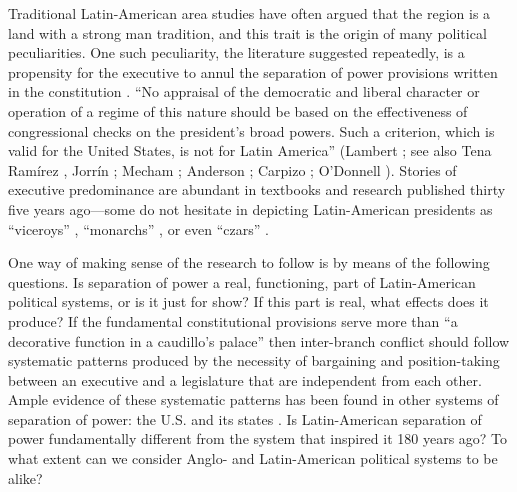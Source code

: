 Traditional Latin-American area studies have often argued that the region is a land with a strong man tradition, and this trait is the origin of many political peculiarities.  One such peculiarity, the literature suggested repeatedly, is a propensity for the executive to annul the separation of power provisions written in the constitution \citep{dealy.1992,segovia.1975,meyer.reyna.1989,garcia.hamilton.1990,wiarda.1992}.  ``No appraisal of the democratic and liberal character or operation of a regime of this nature should be based on the effectiveness of congressional checks on the president's broad powers.  Such a criterion, which is valid for the United States, is not for Latin America'' (Lambert \citeyear[][19]{lambert.1971}; see also Tena Ramírez \citeyear{tena.1949}, Jorrín \citeyear{jorrin.1953}; Mecham \citeyear{mecham.1959}; Anderson \citeauthor{anderson.1967}; Carpizo \citeyear{carpizo.1978}; O'Donnell \citeyear{odonnell.1994}).  Stories of executive predominance are abundant in textbooks and research published thirty five years ago---some do not hesitate in depicting Latin-American presidents as ``viceroys'' \citep[][291]{scott.1958}, ``monarchs'' \citep[][410]{edelmann.1969}, or even ``czars'' \citep[][225]{pierson.gil.1957}.  

One way of making sense of the research to follow is by means of the following questions.  Is separation of power a real, functioning, part of Latin-American political systems, or is it just for show?  If this part is real, what effects does it produce?  If the fundamental constitutional provisions serve more than ``a decorative function in a caudillo's palace'' \citep[][399]{lambert.gandolfi.1987} then inter-branch conflict should follow systematic patterns produced by the necessity of bargaining and position-taking between an executive and a legislature that are independent from each other.  Ample evidence of these systematic patterns has been found in other systems of separation of power: the U.S. and its states \citep[see][]{cox.kernell.1991,alt.lowry.1994,poterba.1994,cameron.2000}.  Is Latin-American separation of power fundamentally different from the system that inspired it 180 years ago?  To what extent can we consider Anglo- and Latin-American political systems to be alike?  

